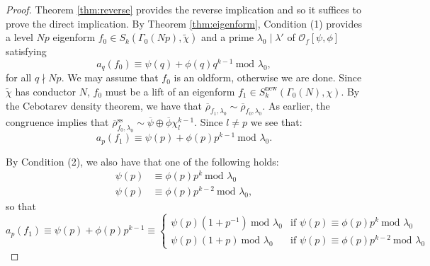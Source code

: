 \documentclass{amsart}
\theoremstyle{plain}
\theoremstyle{definition}
\begin{document}
\begin{proof}
Theorem \ref{thm:reverse} provides the reverse implication and so it suffices to prove the direct implication. By Theorem \ref{thm:eigenform}, Condition (1) provides a level $Np$ eigenform $f_0\in S_k(\Gamma_0(Np), \tilde{\chi})$ and a prime $\lambda_0\mid \lambda'$ of $\mathcal{O}_f[\psi,\phi]$ satisfying \[a_q(f_0) \equiv \psi(q)+\phi(q)q^{k-1} \ \text{mod } \lambda_0,\] for all $q\nmid Np$. We may assume that $f_0$ is an oldform, otherwise we are done. Since $\tilde{\chi}$ has conductor $N$, $f_0$ must be a lift of an eigenform $f_1\in S_k^{\text{new}}(\Gamma_0(N),\chi)$. By the Cebotarev density theorem, we have that $\overline{\rho}_{f_1,\lambda_0}\sim\overline{\rho}_{f_0,\lambda_0}$. As earlier, the congruence implies that $\overline{\rho}_{f_0,\lambda_0}^{\text{ss}}\sim\overline{\psi} \oplus \overline{\phi} \chi_l^{k-1}$. Since $l \neq p$ we see that:
\begin{equation*}
    a_p(f_1) \equiv \psi(p) + \phi(p)p^{k-1} \ \text{mod } \lambda_0.
\end{equation*} 

\noindent By Condition (2), we also have that one of the following holds: \begin{align*}\psi(p) &\equiv \phi(p)p^k \ \text{mod } \lambda_0\\ \psi(p) &\equiv \phi(p)p^{k-2} \ \text{mod } \lambda_0,\end{align*} so that
\begin{equation*}
    a_p(f_1) \equiv \psi(p)+\phi(p)p^{k-1} \equiv 
    \begin{cases}
    \psi(p)(1 + p^{-1}) \ \text{mod } \lambda_0 & \text{if } \psi(p) \equiv \phi(p)p^k \ \text{mod } \lambda_0 \\
    \psi(p)(1 + p) \ \text{mod } \lambda_0 & \text{if } \psi(p) \equiv \phi(p)p^{k-2} \ \text{mod } \lambda_0 
    \end{cases}
\end{equation*}


\end{proof}
\end{document}
